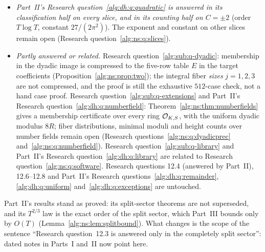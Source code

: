 \documentclass[11pt]{article}
\numberwithin{equation}{section}
\theoremstyle{plain}
\theoremstyle{plain}
\theoremstyle{plain}
\theoremstyle{definition}
\theoremstyle{definition}
\theoremstyle{definition}
\theoremstyle{remark}
\begin{document}
\begin{itemize}[itemsep=2pt,topsep=3pt]
$(A,B,c)$ that needs no factorization of the inverse cubic.
\item \emph{Part~II's Research question~\ref{alg:dh:q:quadratic} is
answered in its classification half on every slice, and in its counting
half on $C=\pm2$} (order $T\log T$, constant $27/(2\pi^2)$). The exponent
and constant on other slices remain open (Research
question~\ref{alg:ns:q:slices}).
\item \emph{Partly answered or related.} Research
question~\ref{alg:sub:q-dyadic}: membership in the dyadic image is
compressed to the five-row table $E$ in the target coefficients
(Proposition~\ref{alg:ns:prop:two}); the integral fiber \emph{sizes}
$j=1,2,3$ are not compressed, and the proof is still the exhaustive
$512$-case check, not a hand case proof. Research
question~\ref{alg:sub:q-extensions} and Part~II's Research
question~\ref{alg:dh:q:numberfield}: Theorem~\ref{alg:ns:thm:numberfields}
gives a membership certificate over every ring $\mathcal O_{K,S}$, with the
uniform dyadic modulus $8R$; fiber distributions, minimal moduli and
height counts over number fields remain open (Research
questions~\ref{alg:ns:q:dyadicprec} and~\ref{alg:ns:q:numberfield}).
Research question~\ref{alg:sub:q-library} and Part~II's Research
question~\ref{alg:dh:q:library} are related to Research
question~\ref{alg:ns:q:software}. Research questions 12.4 (answered by
Part~II), 12.6--12.8 and Part~II's Research
questions~\ref{alg:dh:q:remainder}, \ref{alg:dh:q:uniform}
and~\ref{alg:dh:q:exceptions} are untouched.
\end{itemize}
Part~II's results stand as proved: its split-sector theorems are not
superseded, and its $T^{2/3}$ law is the exact order of the split
sector, which Part~III bounds only by $O(T)$
(Lemma~\ref{alg:ns:lem:splitbound}). What changes is the scope of the
sentence ``Research question~12.3 is answered only in the completely split
sector'': dated notes in Parts~I and~II now point here.
\end{document}
